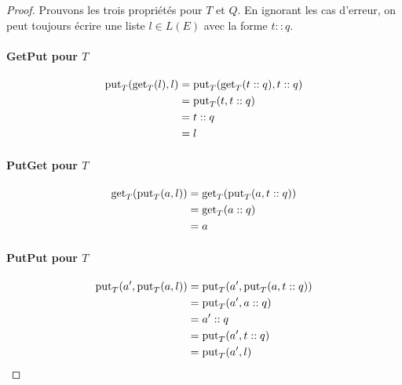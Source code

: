 \begin{proof}

Prouvons les trois propriétés pour $T$ et $Q$. En ignorant les cas d'erreur, on
peut toujours écrire une liste $l ∈ L(E)$ avec la forme $t::q$.

\paragraph{GetPut pour $T$}

\begin{align*}
\mathrm{put}_{T}(\mathrm{get}_{T}(l), l) & = \mathrm{put}_{T}(\mathrm{get}_{T}(t::q), t::q) \\
                               & = \mathrm{put}_{T}(t, t::q) \\
                               & = t::q \\
                               & = l \\
\end{align*}

\paragraph{PutGet pour $T$}

\begin{align*}
  \mathrm{get}_{T}(\mathrm{put}_{T}(a, l)) & = \mathrm{get}_{T}(\mathrm{put}_{T}(a, t::q)) \\
                                 & = \mathrm{get}_{T}(a::q) \\
                                 & = a \\
\end{align*}

\paragraph{PutPut pour $T$}

\begin{align*}
\mathrm{put}_{T}(a', \mathrm{put}_{T}(a, l)) & = \mathrm{put}_{T}(a', \mathrm{put}_{T}(a, t::q)) \\
                                   & = \mathrm{put}_{T}(a', a::q) \\
                                   & = a'::q \\
                                   & = \mathrm{put}_{T}(a', t::q) \\
                                   & = \mathrm{put}_{T}(a', l) \\
\end{align*}


\end{proof}
